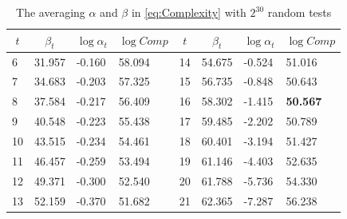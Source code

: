 \begin{table}[htbp]
  \centering
  \caption{The averaging $\alpha$ and $\beta$ in \eqref{eq:Complexity} with $2^{30}$ random tests}\label{tab:ZhangAlphaAndBeta}
    \begin{tabular}{|l|l|l|l|l|l|l|l|}
    \hline
    \multicolumn{1}{|c|}{$t$} & \multicolumn{1}{c|}{$\beta_t$} & \multicolumn{1}{c|}{$\log\alpha_t$} & \multicolumn{1}{c|}{$\log Comp$} & \multicolumn{1}{c|}{$t$} & \multicolumn{1}{c|}{$\beta_t$} & \multicolumn{1}{c|}{$\log\alpha_t$} & \multicolumn{1}{c|}{$\log Comp$} \\
    \hline

    6    & 31.957 & -0.160 & 58.094 & 14    & 54.675 & -0.524 &  51.016\\
    \hline
    7    & 34.683 & -0.203 & 57.325 & 15    & 56.735 & -0.848 &  50.643\\
    \hline
    8    & 37.584 & -0.217 & 56.409 & 16    & 58.302 & -1.415 &  \textbf{50.567}\\
    \hline
    9    &  40.548 & -0.223 & 55.438 & 17    & 59.485 & -2.202 &  50.789\\
    \hline
    10    & 43.515 & -0.234 & 54.461 & 18    & 60.401 & -3.194 &  51.427\\
    \hline
    11    & 46.457 & -0.259 & 53.494 & 19    & 61.146 & -4.403 &  52.635\\
    \hline
    12    & 49.371 & -0.300 & 52.540 & 20    & 61.788 & -5.736 &  54.330\\
    \hline
    13    & 52.159 & -0.370 & 51.682 & 21    & 62.365 & -7.287 &  56.238\\
    \hline
    \end{tabular}%
\end{table}%


